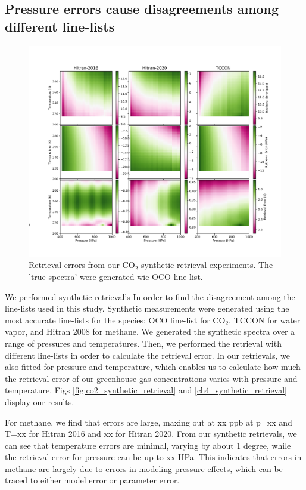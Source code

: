 \documentclass[amt, manuscript]{copernicus}
\begin{document}
\subsection{Pressure errors cause disagreements among different line-lists}

\begin{figure}
  \centering
  \includegraphics{heatmap_co2.pdf}
  \caption{Retrieval errors from our CO$_2$ synthetic retrieval experiments. The 'true spectra' were generated wie OCO line-list.}
  \label{fig:co2_retrieval_error}
\end{figure}
We performed synthetic retrieval’s In order to find the disagreement among the line-lists used in this study. Synthetic measurements were generated using the most accurate line-lists for the species: OCO line-list for CO$_2$, TCCON for water vapor, and Hitran 2008 for methane. We generated the synthetic spectra over a range of pressures and temperatures. Then, we performed the retrieval with different line-lists in order to calculate the retrieval error. In our retrievals, we also fitted for pressure and temperature, which enables us to calculate how much the retrieval error of our greenhouse gas concentrations varies with pressure and temperature. Figs \ref{fig:co2_synthetic_retrieval} and \ref{ch4_synthetic_retrieval} display our results.

For methane, we find that errors are large, maxing out at xx ppb at p=xx and T=xx for Hitran 2016 and xx for Hitran 2020. From our synthetic retrievals, we can see that temperature errors are minimal, varying by about 1 degree, while the retrieval error for pressure can be up to xx HPa. This indicates that errors in methane are largely due to errors in modeling pressure effects, which can be traced to either model error or parameter error.
\end{document}
